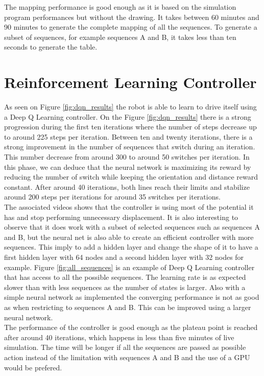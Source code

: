         The mapping performance is good enough as it is based on the simulation program performances but without the drawing. It takes between 60 minutes and 90 minutes to generate the complete mapping of all the sequences. To generate a subset of sequences, for example sequences A and B, it takes less than ten seconds to generate the table.
        
    \section{Reinforcement Learning Controller}
        As seen on Figure \ref{fig:dqn_results} the robot is able to learn to drive itself using a Deep Q Learning controller. On the Figure \ref{fig:dqn_results} there is a strong progression during the first ten iterations where the number of steps decrease up to around 225 steps per iteration. Between ten and twenty iterations, there is a strong improvement in the number of sequences that switch during an iteration. This number decrease from around 300 to around 50 switches per iteration. In this phase, we can deduce that the neural network is maximizing its reward by reducing the number of switch while keeping the orientation and distance reward constant. After around 40 iterations, both lines reach their limits and stabilize around 200 steps per iterations for around 35 switches per iterations.\\
        
        The associated videos shows that the controller is using most of the potential it has and stop performing unnecessary displacement. It is also interesting to observe that it does work with a subset of selected sequences such as sequences A and B, but the neural net is also able to create an efficient controller with more sequences. This imply to add a hidden layer and change the shape of it to have a first hidden layer with 64 nodes and a second hidden layer with 32 nodes for example. Figure \ref{fig:all_sequences} is an example of Deep Q Learning controller that has access to all the possible sequences. The learning rate is as expected slower than with less sequences as the number of states is larger. Also with a simple neural network as implemented the converging performance is not as good as when restricting to sequences A and B. This can be improved using a larger neural network.\\
        
        The performance of the controller is good enough as the plateau point is reached after around 40 iterations, which happens in less than five minutes of live simulation. The time will be longer if all the sequences are passed as possible action instead of the limitation with sequences A and B and the use of a GPU would be prefered.
        